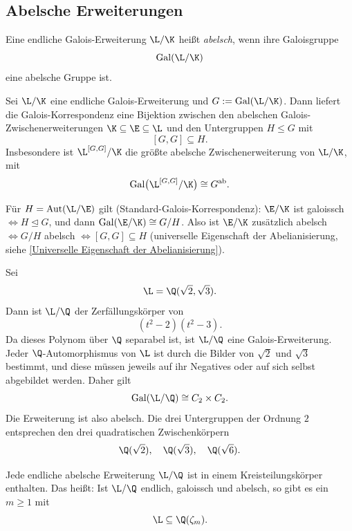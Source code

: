 \documentclass[11pt, a4paper]{article}
\begin{document}
\subsection{Abelsche Erweiterungen}

\begin{definition}
Eine endliche Galois-Erweiterung $\L/\K$ heißt \emph{abelsch}, wenn ihre Galoisgruppe
\[
\mathrm{Gal}(\L/\K)
\]
eine abelsche Gruppe ist.
\end{definition}

\begin{lemma}
\Theorem
Sei $\L/\K$ eine endliche Galois-Erweiterung und $G := \mathrm{Gal}(\L/\K)$. Dann liefert die Galois-Korrespondenz eine Bijektion zwischen den abelschen Galois-Zwischenerweiterungen $\K \subseteq \E \subseteq \L$ und den Untergruppen $H \leq G$ mit
$$
[G,G] \subseteq H.
$$
Insbesondere ist $\L^{[G,G]}/\K$ die größte abelsche Zwischenerweiterung von $\L/\K$, mit
$$
\mathrm{Gal}\bigl(\L^{[G,G]}/\K\bigr) \cong G^{\mathrm{ab}}.
$$
\end{lemma}

\begin{note}
Für $H = \mathrm{Aut}(\L/\E)$ gilt (Standard-Galois-Korrespondenz): $\E/\K$ ist galoissch $\iff H \trianglelefteq G$, und dann $\mathrm{Gal}(\E/\K) \cong G/H$. Also ist $\E/\K$ zusätzlich abelsch $\iff G/H$ abelsch $\iff [G,G] \subseteq H$ (universelle Eigenschaft der Abelianisierung, siehe \ref{Universelle Eigenschaft der Abelianisierung}).
\end{note}


\begin{example}
Sei
\[
\L = \Q(\sqrt{2}, \sqrt{3}).
\]
Dann ist $\L/\Q$ der Zerfällungskörper von
\[
(t^2 - 2)(t^2 - 3).
\]
Da dieses Polynom über $\Q$ separabel ist, ist $\L/\Q$ eine Galois-Erweiterung. Jeder $\Q$-Automorphismus von $\L$ ist durch die Bilder von $\sqrt{2}$ und $\sqrt{3}$ bestimmt, und diese müssen jeweils auf ihr Negatives oder auf sich selbst abgebildet werden. Daher gilt
\[
\mathrm{Gal}(\L/\Q) \cong C_2 \times C_2.
\]
Die Erweiterung ist also abelsch. Die drei Untergruppen der Ordnung $2$ entsprechen den drei quadratischen Zwischenkörpern
\[
\Q(\sqrt{2}), \quad \Q(\sqrt{3}), \quad \Q(\sqrt{6}).
\]
\end{example}

\begin{theorem}
\Theorem
Jede endliche abelsche Erweiterung $\L/\Q$ ist in einem Kreisteilungskörper enthalten. Das heißt: Ist $\L/\Q$ endlich, galoissch und abelsch, so gibt es ein $m \geq 1$ mit
$$
\L \subseteq \Q(\zeta_m).
$$
\end{theorem}
\end{document}
